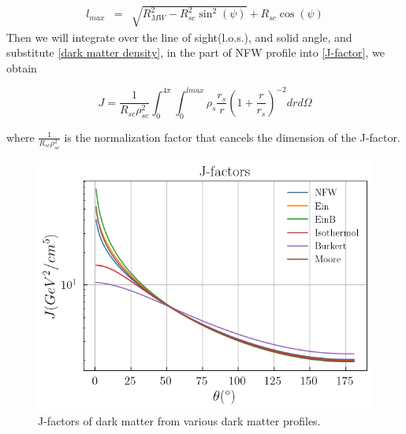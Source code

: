 \documentclass[10pt, oneside]{book}
\numberwithin{equation}{chapter}
\begin{document}
\begin{eqnarray}\label{lmax}
    l_{max} &=& \sqrt{R_{MW}^2-R_{sc}^2\sin^2(\psi)}+R_{sc}\cos(\psi)
\end{eqnarray}
Then we will integrate over the line of sight(l.o.s.), and solid angle, and substitute \autoref{dark matter density}, in the part of NFW profile into \autoref{J-factor}, we obtain

\begin{equation}
	J=\frac{1}{R_{sc}\rho_{sc}^2}\int_{0}^{4\pi}\int_{0}^{l{max}}\rho_s \frac{r_s}{r}\left(1+\frac{r}{r_s}\right)^{-2}drd\Omega
\end{equation}

where $\frac{1}{R_{sc}\rho_{sc}^2}$ is the normalization factor that cancels the dimension of the J-factor.
\begin{figure}
	\centering
	\includegraphics[width=0.75\linewidth]{images/J-factors.png}
	\caption{J-factors of dark matter from various dark matter profiles.}
	\label{J-factor fig}
\end{figure}
\end{document}
